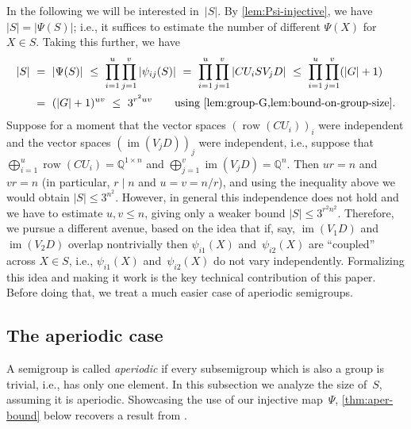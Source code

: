 \documentclass{lmcs}
\theoremstyle{definition}
\DeclareMathOperator{\im}{im}
\DeclareMathOperator{\row}{row}
\newcommand{\Q}{\mathbb{Q}}
\begin{document}
In the following we will be interested in~$|S|$.
By \cref{lem:Psi-injective}, we have $|S| = |\Psi(S)|$; i.e., it suffices to estimate the number of different $\Psi(X)$ for $X \in S$.
Taking this further, we have
\begin{align*}
|S| \ &= \ |\Psi(S)| \ \le \ \prod_{i=1}^u \prod_{j=1}^v |\psi_{i j}(S)| \ = \ \prod_{i=1}^u \prod_{j=1}^v |C U_i S V_j D| 
 \ \le \ \prod_{i=1}^u \prod_{j=1}^v (|G|+1) \ \\ 
&= \ (|G|+1)^{u v} \ \le \ 3^{r^2 u v} \qquad \text{using \cref{lem:group-G,lem:bound-on-group-size}.}
\end{align*}
Suppose for a moment that the vector spaces $(\row(C U_i))_i$ were independent and the vector spaces $(\im(V_j D))_j$ were independent,
 i.e., suppose that $\bigoplus_{i=1}^u \row(C U_i) = \Q^{1 \times n}$ and $\bigoplus_{j=1}^v \im(V_j D) = \Q^{n}$.
Then $u r = n$ and $v r = n$ (in particular, $r \mid n$ and $u = v = n/r$), and using the inequality above we would obtain $|S| \le 3^{n^2}$.
However, in general this independence does not hold and we have to estimate $u,v \le n$, giving only a weaker bound $|S| \le 3^{r^2 n^2}$.
Therefore, we pursue a different avenue, based on the idea that if, say, $\im(V_1 D)$ and $\im(V_2 D)$ overlap nontrivially then $\psi_{i 1}(X)$ and~$\psi_{i 2}(X)$ are ``coupled'' across $X \in S$, i.e., $\psi_{i 1}(X)$ and~$\psi_{i 2}(X)$ do not vary independently.
Formalizing this idea and making it work is the key technical contribution of this paper. Before doing that, we treat a much easier case of aperiodic semigroups.

\subsection{The aperiodic case} \label{sub:aperiodic}

A semigroup is called \emph{aperiodic} if every subsemigroup which is also a group is trivial, i.e., has only one element. 
In this subsection we analyze the size of~$S$, assuming it is aperiodic.
Showcasing the use of our injective map~$\Psi$, \cref{thm:aper-bound} below recovers a result from \cite{AlmeidaSteinberg09}.
\end{document}
